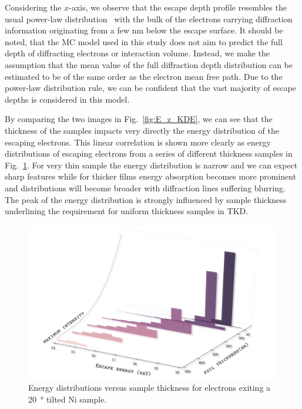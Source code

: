Considering the $x$-axis, we observe that the escape depth profile resembles the usual power-law distribution~\cite{winkelmann2016} with the bulk of the electrons carrying diffraction information originating from a few nm below the escape surface. It should be noted, that the MC model used in this study does not aim to predict the full depth of diffracting electrons or interaction volume. Instead, we make the assumption that the mean value of the full diffraction depth distribution can be estimated to be of the same order as the electron mean free path. Due to the power-law distribution rule, we can be confident that the vast majority of escape depths is considered in this model.

By comparing the two images in Fig.~\ref{fig:E_z_KDE}, we can see that the thickness of the samples impacts very directly the energy distribution of the escaping electrons. This linear correlation is shown more clearly as energy distributions of escaping electrons from a series of different thickness samples in Fig.~\ref{fig:TKDescapeE}. For very thin sample the energy distribution is narrow and we can expect sharp features while for thicker films energy absorption becomes more prominent and distributions will become broader with diffraction lines suffering blurring. The peak of the energy distribution is strongly influenced by sample thickness underlining the requirement for uniform thickness samples in TKD.

\begin{figure}[ht]
\centering
\includegraphics[width=5in]{Figures/TKD_escapeE.png}
\caption[Energy distributions versus sample thickness.]{Energy distributions versus sample thickness for electrons exiting a \SI{20}{\degree}  tilted Ni sample.   }
\label{fig:TKDescapeE}
\end{figure}



